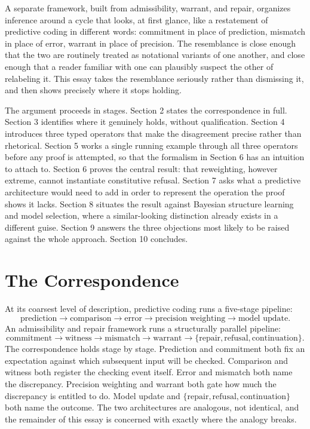 \documentclass[11pt]{article}
\begin{document}
A separate framework, built from admissibility, warrant, and repair, organizes inference around a cycle that looks, at first glance, like a restatement of predictive coding in different words: commitment in place of prediction, mismatch in place of error, warrant in place of precision. The resemblance is close enough that the two are routinely treated as notational variants of one another, and close enough that a reader familiar with one can plausibly suspect the other of relabeling it. This essay takes the resemblance seriously rather than dismissing it, and then shows precisely where it stops holding.

The argument proceeds in stages. Section 2 states the correspondence in full. Section 3 identifies where it genuinely holds, without qualification. Section 4 introduces three typed operators that make the disagreement precise rather than rhetorical. Section 5 works a single running example through all three operators before any proof is attempted, so that the formalism in Section 6 has an intuition to attach to. Section 6 proves the central result: that reweighting, however extreme, cannot instantiate constitutive refusal. Section 7 asks what a predictive architecture would need to add in order to represent the operation the proof shows it lacks. Section 8 situates the result against Bayesian structure learning and model selection, where a similar-looking distinction already exists in a different guise. Section 9 answers the three objections most likely to be raised against the whole approach. Section 10 concludes.

\section{The Correspondence}

At its coarsest level of description, predictive coding runs a five-stage pipeline:
\[
\text{prediction} \rightarrow \text{comparison} \rightarrow \text{error} \rightarrow \text{precision weighting} \rightarrow \text{model update}.
\]
An admissibility and repair framework runs a structurally parallel pipeline:
\[
\text{commitment} \rightarrow \text{witness} \rightarrow \text{mismatch} \rightarrow \text{warrant} \rightarrow \{\text{repair}, \text{refusal}, \text{continuation}\}.
\]
The correspondence holds stage by stage. Prediction and commitment both fix an expectation against which subsequent input will be checked. Comparison and witness both register the checking event itself. Error and mismatch both name the discrepancy. Precision weighting and warrant both gate how much the discrepancy is entitled to do. Model update and $\{\text{repair}, \text{refusal}, \text{continuation}\}$ both name the outcome. The two architectures are analogous, not identical, and the remainder of this essay is concerned with exactly where the analogy breaks.
\end{document}
